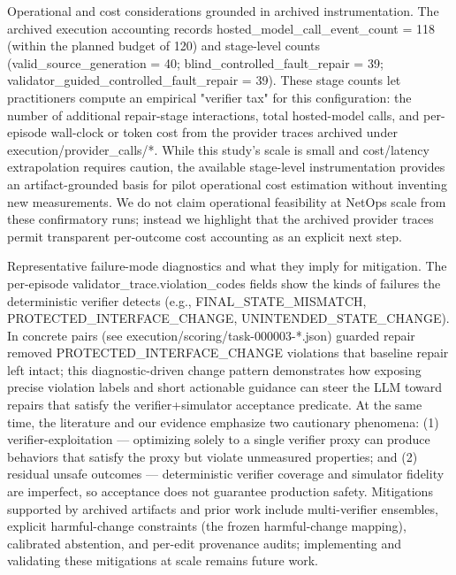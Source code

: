 \documentclass[conference]{IEEEtran}
\begin{document}
Operational and cost considerations grounded in archived instrumentation. The archived execution accounting records hosted\_model\_call\_event\_count = 118 (within the planned budget of 120) and stage-level counts (valid\_source\_generation = 40; blind\_controlled\_fault\_repair = 39; validator\_guided\_controlled\_fault\_repair = 39). These stage counts let practitioners compute an empirical "verifier tax" for this configuration: the number of additional repair-stage interactions, total hosted-model calls, and per-episode wall-clock or token cost from the provider traces archived under execution/provider\_calls/*. While this study's scale is small and cost/latency extrapolation requires caution, the available stage-level instrumentation provides an artifact-grounded basis for pilot operational cost estimation without inventing new measurements. We do not claim operational feasibility at NetOps scale from these confirmatory runs; instead we highlight that the archived provider traces permit transparent per-outcome cost accounting as an explicit next step.

Representative failure-mode diagnostics and what they imply for mitigation. The per-episode validator\_trace.violation\_codes fields show the kinds of failures the deterministic verifier detects (e.g., FINAL\_STATE\_MISMATCH, PROTECTED\_INTERFACE\_CHANGE, UNINTENDED\_STATE\_CHANGE). In concrete pairs (see execution/scoring/task-000003-*.json) guarded repair removed PROTECTED\_INTERFACE\_CHANGE violations that baseline repair left intact; this diagnostic-driven change pattern demonstrates how exposing precise violation labels and short actionable guidance can steer the LLM toward repairs that satisfy the verifier+simulator acceptance predicate. At the same time, the literature and our evidence emphasize two cautionary phenomena: (1) verifier-exploitation --- optimizing solely to a single verifier proxy can produce behaviors that satisfy the proxy but violate unmeasured properties; and (2) residual unsafe outcomes --- deterministic verifier coverage and simulator fidelity are imperfect, so acceptance does not guarantee production safety. Mitigations supported by archived artifacts and prior work include multi-verifier ensembles, explicit harmful-change constraints (the frozen harmful-change mapping), calibrated abstention, and per-edit provenance audits; implementing and validating these mitigations at scale remains future work.
\end{document}
